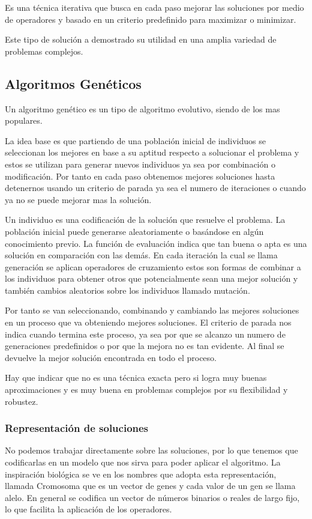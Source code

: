 Es una técnica iterativa que busca en cada paso mejorar las soluciones por medio de operadores y basado en un criterio predefinido para maximizar o minimizar.

Este tipo de solución a demostrado su utilidad en una amplia variedad de problemas complejos.


\subsection{Algoritmos Genéticos}
Un algoritmo genético es un tipo de algoritmo evolutivo, siendo de los mas populares.

La idea base es que partiendo de una población inicial de individuos se seleccionan los mejores en base a su aptitud respecto a solucionar el problema y estos se utilizan para generar nuevos individuos ya sea por combinación o modificación. Por tanto en cada paso obtenemos mejores soluciones hasta detenernos usando un criterio de parada ya sea el numero de iteraciones o cuando ya no se puede mejorar mas la solución.

Un individuo es una codificación de la solución que resuelve el problema.
La población inicial puede generarse aleatoriamente o basándose en algún conocimiento previo.
La función de evaluación indica que tan buena o apta es una solución en comparación con las demás.
En cada iteración la cual se llama generación se aplican operadores de cruzamiento estos son formas de combinar a los individuos para obtener otros que potencialmente sean una mejor solución y también cambios aleatorios sobre los individuos llamado mutación.

Por tanto se van seleccionando, combinando y cambiando las mejores soluciones en un proceso que va obteniendo mejores soluciones.
El criterio de parada nos indica cuando termina este proceso, ya sea por que se alcanzo un numero de generaciones predefinidos o por que la mejora no es tan evidente. Al final se devuelve la mejor solución encontrada en todo el proceso.


Hay que indicar que no es una técnica exacta pero si logra muy buenas aproximaciones y es muy buena en problemas complejos por su flexibilidad y robustez. 


\subsubsection{Representación de soluciones}
No podemos trabajar directamente sobre las soluciones, por lo que tenemos que codificarlas en un modelo que nos sirva para poder aplicar el algoritmo.
La inspiración biológica se ve en los nombres que adopta esta representación, llamada Cromosoma que es un vector de genes y cada valor de un gen se llama alelo.
En general se codifica un vector de números binarios o reales de largo fijo, lo que facilita la aplicación de los operadores.

